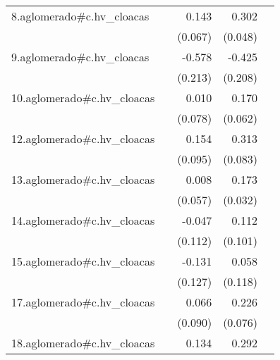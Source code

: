 {\begin{longtable}{l*{4}{D{.}{.}{-1}}}
\addlinespace
8.aglomerado#c.hv\_cloacas&                     &       0.143\sym{*}  &       0.302\sym{***}&                     \\
            &                     &     (0.067)         &     (0.048)         &                     \\
\addlinespace
9.aglomerado#c.hv\_cloacas&                     &      -0.578\sym{**} &      -0.425\sym{*}  &                     \\
            &                     &     (0.213)         &     (0.208)         &                     \\
\addlinespace
10.aglomerado#c.hv\_cloacas&                     &       0.010         &       0.170\sym{**} &                     \\
            &                     &     (0.078)         &     (0.062)         &                     \\
\addlinespace
12.aglomerado#c.hv\_cloacas&                     &       0.154         &       0.313\sym{***}&                     \\
            &                     &     (0.095)         &     (0.083)         &                     \\
\addlinespace
13.aglomerado#c.hv\_cloacas&                     &       0.008         &       0.173\sym{***}&                     \\
            &                     &     (0.057)         &     (0.032)         &                     \\
\addlinespace
14.aglomerado#c.hv\_cloacas&                     &      -0.047         &       0.112         &                     \\
            &                     &     (0.112)         &     (0.101)         &                     \\
\addlinespace
15.aglomerado#c.hv\_cloacas&                     &      -0.131         &       0.058         &                     \\
            &                     &     (0.127)         &     (0.118)         &                     \\
\addlinespace
17.aglomerado#c.hv\_cloacas&                     &       0.066         &       0.226\sym{**} &                     \\
            &                     &     (0.090)         &     (0.076)         &                     \\
\addlinespace
18.aglomerado#c.hv\_cloacas&                     &       0.134         &       0.292\sym{***}&                     \\

\end{longtable}}
